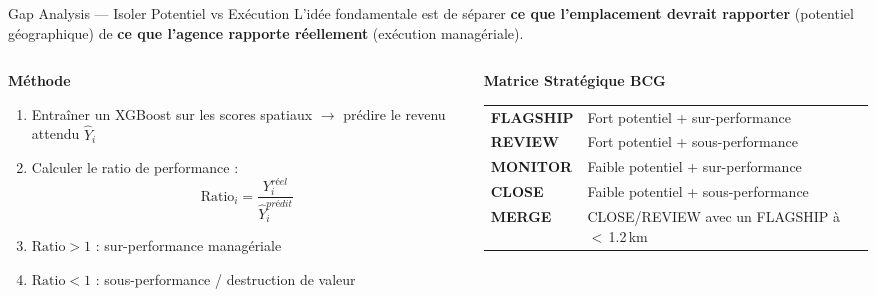 \documentclass[aspectratio=169, 9pt]{beamer}
\begin{document}
\begin{frame}{Gap Analysis --- Isoler Potentiel vs Exécution}
  \vspace{0.2cm}
  L'idée fondamentale est de séparer \textbf{ce que l'emplacement devrait rapporter} (potentiel géographique) de \textbf{ce que l'agence rapporte réellement} (exécution managériale).

  \vspace{0.4cm}
  \begin{columns}[T]
    \begin{column}{0.48\textwidth}
      {\color{AccentOrange}\faCogs} \textbf{Méthode}
      \begin{enumerate}
        \item Entraîner un XGBoost sur les scores spatiaux $\rightarrow$ prédire le revenu attendu $\hat{Y}_i$
        \item Calculer le ratio de performance : $$\text{Ratio}_i = \frac{Y_i^{réel}}{\hat{Y}_i^{prédit}}$$
        \item $\text{Ratio} > 1$ : sur-performance managériale
        \item $\text{Ratio} < 1$ : sous-performance / destruction de valeur
      \end{enumerate}
    \end{column}
    \begin{column}{0.48\textwidth}
      {\color{AccentBlue}\faThLarge} \textbf{Matrice Stratégique BCG}
      \vspace{0.2cm}

      {\small
      \begin{tabular}{@{}l p{5.8cm}@{}}
        {\color{AccentGreen}\textbf{FLAGSHIP}} & Fort potentiel + sur-performance \\[3pt]
        {\color{AccentOrange}\textbf{REVIEW}} & Fort potentiel + sous-performance \\[3pt]
        {\color{AccentBlue}\textbf{MONITOR}} & Faible potentiel + sur-performance \\[3pt]
        {\color{AccentRed}\textbf{CLOSE}} & Faible potentiel + sous-performance \\[3pt]
        {\color{AccentPurple}\textbf{MERGE}} & CLOSE/REVIEW avec un FLAGSHIP à $<$\,1.2\,km \\
      \end{tabular}
      }
    \end{column}
  \end{columns}
\end{frame}
\end{document}

